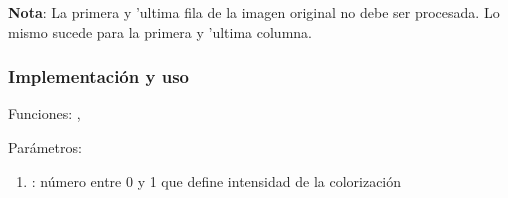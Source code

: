 \begin{framed}
  \noindent \textbf{Nota}: La primera y 'ultima fila de la imagen original no
  debe ser procesada. Lo mismo sucede para la primera y 'ultima columna.
\end{framed}


\subsubsection*{Implementación y uso}

\noindent Funciones: , 

\noindent Parámetros: 

\begin{enumerate}[-]
\item {}: número entre 0 y 1 que define intensidad de la colorización
\end{enumerate}


